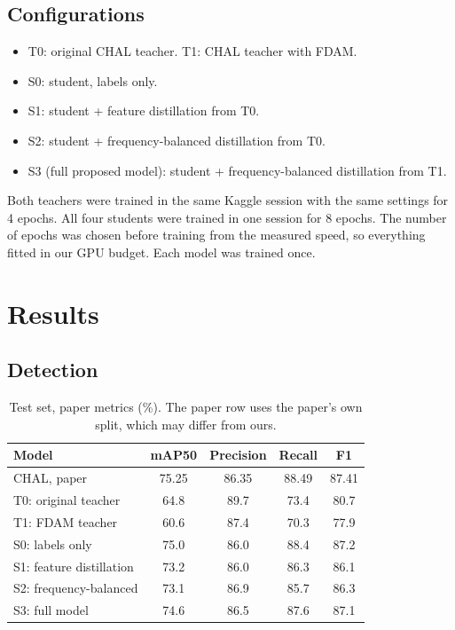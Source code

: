\documentclass[11pt,a4paper]{article}
\begin{document}
\subsection{Configurations}

\begin{itemize}
  \item T0: original CHAL teacher. \quad T1: CHAL teacher with FDAM.
  \item S0: student, labels only.
  \item S1: student + feature distillation from T0.
  \item S2: student + frequency-balanced distillation from T0.
  \item S3 (full proposed model): student + frequency-balanced distillation from T1.
\end{itemize}
Both teachers were trained in the same Kaggle session with the same settings for 4 epochs. All four students were
trained in one session for 8 epochs. The number of epochs was chosen before training from the measured speed, so
everything fitted in our GPU budget. Each model was trained once.

\section{Results}

\subsection{Detection}

\begin{table}[htbp]
\centering
\caption{Test set, paper metrics (\%). The paper row uses the paper's own split, which may differ from ours.}
\label{tab:paper-metrics}
\begin{tabular}{lcccc}
\toprule
Model & mAP50 & Precision & Recall & F1 \\
\midrule
CHAL, paper & 75.25 & 86.35 & 88.49 & 87.41 \\
\midrule
T0: original teacher & 64.8 & 89.7 & 73.4 & 80.7 \\
T1: FDAM teacher & 60.6 & 87.4 & 70.3 & 77.9 \\
S0: labels only & 75.0 & 86.0 & 88.4 & 87.2 \\
S1: feature distillation & 73.2 & 86.0 & 86.3 & 86.1 \\
S2: frequency-balanced & 73.1 & 86.9 & 85.7 & 86.3 \\
S3: full model & 74.6 & 86.5 & 87.6 & 87.1 \\
\bottomrule
\end{tabular}
\end{table}
\end{document}
